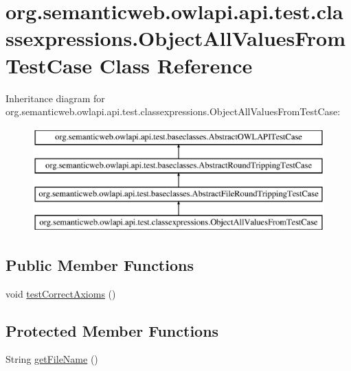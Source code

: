 \hypertarget{classorg_1_1semanticweb_1_1owlapi_1_1api_1_1test_1_1classexpressions_1_1_object_all_values_from_test_case}{\section{org.\-semanticweb.\-owlapi.\-api.\-test.\-classexpressions.\-Object\-All\-Values\-From\-Test\-Case Class Reference}
\label{classorg_1_1semanticweb_1_1owlapi_1_1api_1_1test_1_1classexpressions_1_1_object_all_values_from_test_case}
}
Inheritance diagram for org.\-semanticweb.\-owlapi.\-api.\-test.\-classexpressions.\-Object\-All\-Values\-From\-Test\-Case\-:\begin{figure}[H]
\begin{center}
\leavevmode
\includegraphics[height=4.000000cm]{classorg_1_1semanticweb_1_1owlapi_1_1api_1_1test_1_1classexpressions_1_1_object_all_values_from_test_case}
\end{center}
\end{figure}
\subsection*{Public Member Functions}
\begin{DoxyCompactItemize}
\item 
void \hyperlink{classorg_1_1semanticweb_1_1owlapi_1_1api_1_1test_1_1classexpressions_1_1_object_all_values_from_test_case_a09ed0612dbe473f9637a12c2eb7997e6}{test\-Correct\-Axioms} ()
\end{DoxyCompactItemize}
\subsection*{Protected Member Functions}
\begin{DoxyCompactItemize}
\item 
String \hyperlink{classorg_1_1semanticweb_1_1owlapi_1_1api_1_1test_1_1classexpressions_1_1_object_all_values_from_test_case_ab64b2bad0573c27314799d3ec890f6af}{get\-File\-Name} ()
\end{DoxyCompactItemize}


